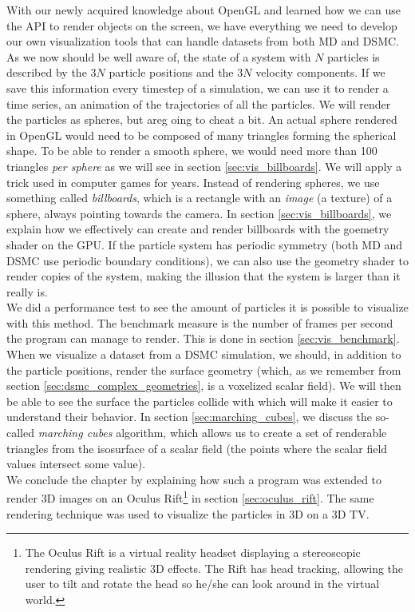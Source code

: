 With our newly acquired knowledge about OpenGL and learned how we can use the API to render objects on the screen, we have everything we need to develop our own visualization tools that can handle datasets from both MD and DSMC. As we now should be well aware of, the state of a system with $N$ particles is described by the $3N$ particle positions and the $3N$ velocity components. If we save this information every timestep of a simulation, we can use it to render a time series, an animation of the trajectories of all the particles. We will render the particles as spheres, but areg oing to cheat a bit. An actual sphere rendered in OpenGL would need to be composed of many triangles forming the spherical shape. To be able to render a smooth sphere, we would need more than 100 triangles \textit{per sphere} as we will see in section \ref{sec:vis_billboards}. We will apply a trick used in computer games for years. Instead of rendering spheres, we use something called \textit{billboards}, which is a rectangle with an \textit{image} (a texture) of a sphere, always pointing towards the camera. In section \ref{sec:vis_billboards}, we explain how we effectively can create and render billboards with the goemetry shader on the GPU. If the particle system has periodic symmetry (both MD and DSMC use periodic boundary conditions), we can also use the geometry shader to render copies of the system, making the illusion that the system is larger than it really is.\\
We did a performance test to see the amount of particles it is possible to visualize with this method. The benchmark measure is the number of frames per second the program can manage to render. This is done in section \ref{sec:vis_benchmark}.\\
When we visualize a dataset from a DSMC simulation, we should, in addition to the particle positions, render the surface geometry (which, as we remember from section \ref{sec:dsmc_complex_geometries}, is a voxelized scalar field). We will then be able to see the surface the particles collide with which will make it easier to understand their behavior. In section \ref{sec:marching_cubes}, we discuss the so-called \textit{marching cubes} algorithm, which allows us to create a set of renderable triangles from the isosurface of a scalar field (the points where the scalar field values intersect some value).\\
We conclude the chapter by explaining how such a program was extended to render 3D images on an Oculus Rift\footnote{The Oculus Rift is a virtual reality headset displaying a stereoscopic rendering giving realistic 3D effects. The Rift has head tracking, allowing the user to tilt and rotate the head so he/she can look around in the virtual world.} in section \ref{sec:oculus_rift}. The same rendering technique was used to visualize the particles in 3D on a 3D TV.